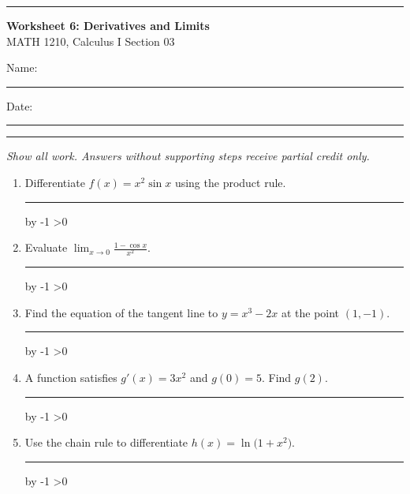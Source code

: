 \documentclass[11pt]{article}
\newcommand{\answerlines}[1]{%
  \par\vspace{0.4em}%
  \newcount\wslines \wslines=#1
  \loop
    \noindent\textcolor{accent!35}{\rule{\linewidth}{0.4pt}}\par\vspace{1.7em}%
    \advance\wslines by -1
  \ifnum\wslines>0 \repeat
}
\begin{document}
{\color{accent}\rule{\linewidth}{2.5pt}}

\vspace{0.5em}
{\LARGE\bfseries Worksheet 6: Derivatives and Limits}\\[2pt]
{\large MATH 1210, Calculus I \hfill Section 03}

\vspace{0.6em}
Name: \rule{2.6in}{0.4pt} \hfill Date: \rule{1.4in}{0.4pt}

\vspace{0.4em}
{\color{accent}\rule{\linewidth}{0.8pt}}

\vspace{0.8em}
\textit{Show all work. Answers without supporting steps receive partial credit only.}

\vspace{1em}
\begin{enumerate}[label=\textbf{Q\arabic*.}, leftmargin=2.6em, itemsep=0.4em]

\item Differentiate $f(x) = x^2 \sin x$ using the product rule.
\answerlines{2}

\item Evaluate $\displaystyle\lim_{x \to 0} \frac{1 - \cos x}{x^2}$.
\answerlines{2}

\item Find the equation of the tangent line to $y = x^3 - 2x$ at the point
$(1, -1)$.
\answerlines{2}

\item A function satisfies $g'(x) = 3x^2$ and $g(0) = 5$. Find $g(2)$.
\answerlines{2}

\item Use the chain rule to differentiate $h(x) = \ln\bigl(1 + x^2\bigr)$.
\answerlines{2}

\end{enumerate}
\end{document}
